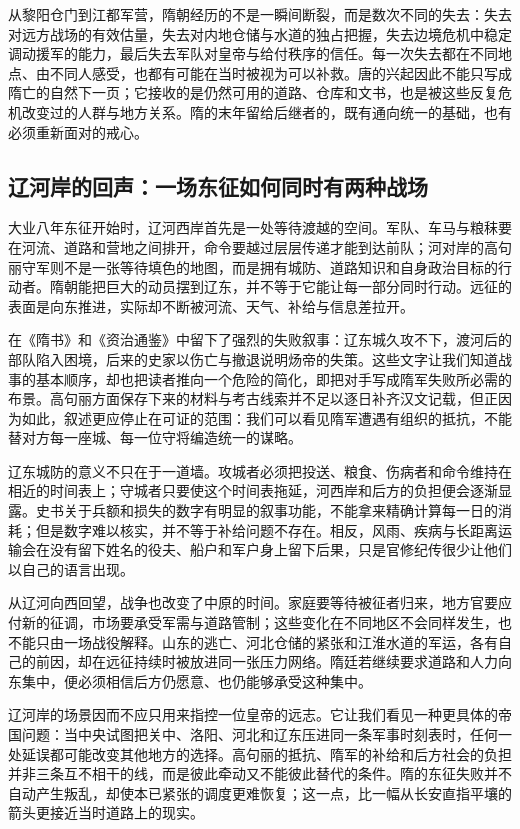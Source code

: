 从黎阳仓门到江都军营，隋朝经历的不是一瞬间断裂，而是数次不同的失去：失去对远方战场的有效估量，失去对内地仓储与水道的独占把握，失去边境危机中稳定调动援军的能力，最后失去军队对皇帝与给付秩序的信任。每一次失去都在不同地点、由不同人感受，也都有可能在当时被视为可以补救。唐的兴起因此不能只写成隋亡的自然下一页；它接收的是仍然可用的道路、仓库和文书，也是被这些反复危机改变过的人群与地方关系。隋的末年留给后继者的，既有通向统一的基础，也有必须重新面对的戒心。

\subsection{辽河岸的回声：一场东征如何同时有两种战场}
大业八年东征开始时，辽河西岸首先是一处等待渡越的空间。军队、车马与粮秣要在河流、道路和营地之间排开，命令要越过层层传递才能到达前队；河对岸的高句丽守军则不是一张等待填色的地图，而是拥有城防、道路知识和自身政治目标的行动者。隋朝能把巨大的动员摆到辽东，并不等于它能让每一部分同时行动。远征的表面是向东推进，实际却不断被河流、天气、补给与信息差拉开。

在《隋书》和《资治通鉴》中留下了强烈的失败叙事：辽东城久攻不下，渡河后的部队陷入困境，后来的史家以伤亡与撤退说明炀帝的失策。这些文字让我们知道战事的基本顺序，却也把读者推向一个危险的简化，即把对手写成隋军失败所必需的布景。高句丽方面保存下来的材料与考古线索并不足以逐日补齐汉文记载，但正因为如此，叙述更应停止在可证的范围：我们可以看见隋军遭遇有组织的抵抗，不能替对方每一座城、每一位守将编造统一的谋略。

辽东城防的意义不只在于一道墙。攻城者必须把投送、粮食、伤病者和命令维持在相近的时间表上；守城者只要使这个时间表拖延，河西岸和后方的负担便会逐渐显露。史书关于兵额和损失的数字有明显的叙事功能，不能拿来精确计算每一日的消耗；但是数字难以核实，并不等于补给问题不存在。相反，风雨、疾病与长距离运输会在没有留下姓名的役夫、船户和军户身上留下后果，只是官修纪传很少让他们以自己的语言出现。

从辽河向西回望，战争也改变了中原的时间。家庭要等待被征者归来，地方官要应付新的征调，市场要承受军需与道路管制；这些变化在不同地区不会同样发生，也不能只由一场战役解释。山东的逃亡、河北仓储的紧张和江淮水道的军运，各有自己的前因，却在远征持续时被放进同一张压力网络。隋廷若继续要求道路和人力向东集中，便必须相信后方仍愿意、也仍能够承受这种集中。

辽河岸的场景因而不应只用来指控一位皇帝的远志。它让我们看见一种更具体的帝国问题：当中央试图把关中、洛阳、河北和辽东压进同一条军事时刻表时，任何一处延误都可能改变其他地方的选择。高句丽的抵抗、隋军的补给和后方社会的负担并非三条互不相干的线，而是彼此牵动又不能彼此替代的条件。隋的东征失败并不自动产生叛乱，却使本已紧张的调度更难恢复；这一点，比一幅从长安直指平壤的箭头更接近当时道路上的现实。

